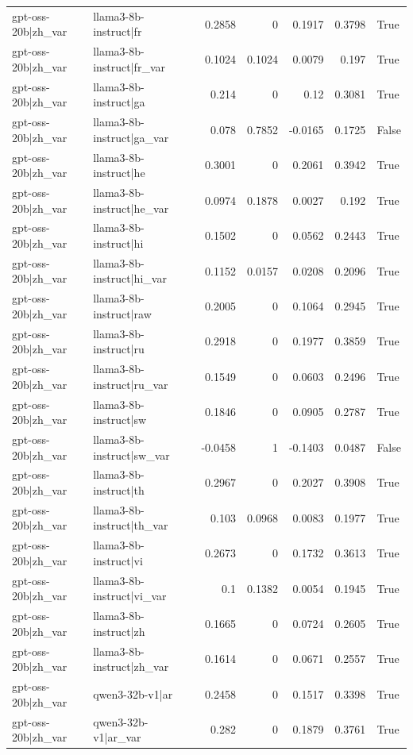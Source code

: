 \begin{table}
\begin{tabular}{l l r r r r l}
gpt-oss-20b|zh_var & llama3-8b-instruct|fr & 0.2858 & 0 & 0.1917 & 0.3798 & True \\
gpt-oss-20b|zh_var & llama3-8b-instruct|fr_var & 0.1024 & 0.1024 & 0.0079 & 0.197 & True \\
gpt-oss-20b|zh_var & llama3-8b-instruct|ga & 0.214 & 0 & 0.12 & 0.3081 & True \\
gpt-oss-20b|zh_var & llama3-8b-instruct|ga_var & 0.078 & 0.7852 & -0.0165 & 0.1725 & False \\
gpt-oss-20b|zh_var & llama3-8b-instruct|he & 0.3001 & 0 & 0.2061 & 0.3942 & True \\
gpt-oss-20b|zh_var & llama3-8b-instruct|he_var & 0.0974 & 0.1878 & 0.0027 & 0.192 & True \\
gpt-oss-20b|zh_var & llama3-8b-instruct|hi & 0.1502 & 0 & 0.0562 & 0.2443 & True \\
gpt-oss-20b|zh_var & llama3-8b-instruct|hi_var & 0.1152 & 0.0157 & 0.0208 & 0.2096 & True \\
gpt-oss-20b|zh_var & llama3-8b-instruct|raw & 0.2005 & 0 & 0.1064 & 0.2945 & True \\
gpt-oss-20b|zh_var & llama3-8b-instruct|ru & 0.2918 & 0 & 0.1977 & 0.3859 & True \\
gpt-oss-20b|zh_var & llama3-8b-instruct|ru_var & 0.1549 & 0 & 0.0603 & 0.2496 & True \\
gpt-oss-20b|zh_var & llama3-8b-instruct|sw & 0.1846 & 0 & 0.0905 & 0.2787 & True \\
gpt-oss-20b|zh_var & llama3-8b-instruct|sw_var & -0.0458 & 1 & -0.1403 & 0.0487 & False \\
gpt-oss-20b|zh_var & llama3-8b-instruct|th & 0.2967 & 0 & 0.2027 & 0.3908 & True \\
gpt-oss-20b|zh_var & llama3-8b-instruct|th_var & 0.103 & 0.0968 & 0.0083 & 0.1977 & True \\
gpt-oss-20b|zh_var & llama3-8b-instruct|vi & 0.2673 & 0 & 0.1732 & 0.3613 & True \\
gpt-oss-20b|zh_var & llama3-8b-instruct|vi_var & 0.1 & 0.1382 & 0.0054 & 0.1945 & True \\
gpt-oss-20b|zh_var & llama3-8b-instruct|zh & 0.1665 & 0 & 0.0724 & 0.2605 & True \\
gpt-oss-20b|zh_var & llama3-8b-instruct|zh_var & 0.1614 & 0 & 0.0671 & 0.2557 & True \\
gpt-oss-20b|zh_var & qwen3-32b-v1|ar & 0.2458 & 0 & 0.1517 & 0.3398 & True \\
gpt-oss-20b|zh_var & qwen3-32b-v1|ar_var & 0.282 & 0 & 0.1879 & 0.3761 & True \\

\end{tabular}
\end{table}
